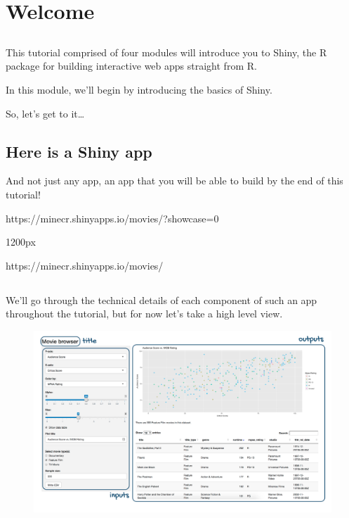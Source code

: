 \documentclass[
  letterpaper,
  DIV=11,
  numbers=noendperiod]{scrreprt}
\begin{document}
\hypertarget{welcome}{%
\section{Welcome}\label{welcome}}

\hypertarget{section}{%
\subsection{}\label{section}}

This tutorial comprised of four modules will introduce you to Shiny, the
R package for building interactive web apps straight from R.

In this module, we'll begin by introducing the basics of Shiny.

So, let's get to it\ldots{}

\hypertarget{here-is-a-shiny-app}{%
\subsection{Here is a Shiny app}\label{here-is-a-shiny-app}}

And not just any app, an app that you will be able to build by the end
of this tutorial!

https://minecr.shinyapps.io/movies/?showcase=0

1200px

https://minecr.shinyapps.io/movies/

\hypertarget{section-1}{%
\subsection{}\label{section-1}}

We'll go through the technical details of each component of such an app
throughout the tutorial, but for now let's take a high level view.

\begin{figure}

{\centering \includegraphics[width=1\textwidth,height=\textheight]{./images/shiny-app-annotated.png}

}

\end{figure}
\end{document}
